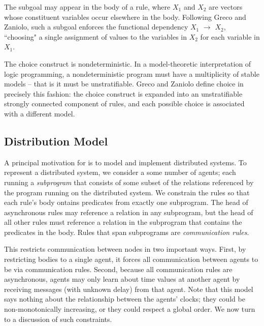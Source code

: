 The subgoal  may appear in the body of a rule, where
\emph{$X_1$} and \emph{$X_2$} are vectors whose constituent variables occur elsewhere in the body.  Following Greco and Zaniolo, such a subgoal
enforces the functional dependency \emph{$X_1$} $\to$ $X_2$, ``choosing" a single assignment of values to the variables
in \emph{$X_2$} for each variable in \emph{$X_1$}.

The choice construct is nondeterministic.  In a model-theoretic interpretation of logic programming, a nondeterministic program 
must have a multiplicity of stable models -- that is it must be unstratifiable.  Greco and Zaniolo define 
choice in precisely this fashion: the choice construct is expanded into an unstratifiable strongly connected component of rules, 
and each possible choice is associated with a different model.

  

\subsection{Distribution Model}

A principal motivation for \lang is to model and implement distributed systems.
To represent a distributed system, we consider a some number of
agents; each running a {\em subprogram} that consists of some subset
of the relations referenced by the \lang program running on the
distributed system.  We constrain the \lang rules so that each rule's
body ontains predicates from exactly one subprogram.  The head of
asynchronous rules may reference a relation in any subprogram, but the
head of all other rules must reference a relation in the subprogram
that contains the predicates in the body.  Rules that span subprograms are
{\em communication rules}.

This restricts communication between nodes in two important ways.
First, by restricting bodies to a single agent, it forces all
communication between agents to be via communication rules.  Second,
because all communication rules are asynchronous, agents may only
learn about time values at another agent by receiving messages (with
unknown delay) from that agent.  Note that this model says nothing
about the relationship between the agents' clocks; they could be
non-monotonically increasing, or they could respect a global order.
We now turn to a discussion of such constraints.

